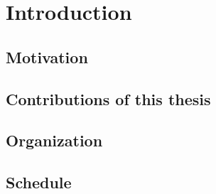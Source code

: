 \chapter{Introduction}
\label{introduction}

\section{Motivation}
\label{motivation}


\section{Contributions of this thesis}
\label{contributions}


\section{Organization}
\label{organization}

 
\section{Schedule}
\label{schedule}

